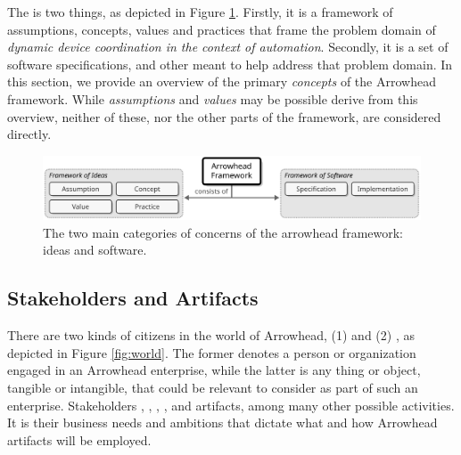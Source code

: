 %
%

The  is two things, as depicted in Figure \ref{fig:framework}.
Firstly, it is a framework of assumptions, concepts, values and practices that frame the problem domain of \textit{dynamic device coordination in the context of automation}.
Secondly, it is a set of software specifications,  and other  meant to help address that problem domain.
In this section, we provide an overview of the primary \textit{concepts} of the Arrowhead framework.
While \textit{assumptions} and \textit{values} may be possible derive from this overview, neither of these, nor the other parts of the framework, are considered directly.

\vspace*{1mm}

\begin{figure}[ht!]
  \centering
  \includegraphics[scale=0.9]{figures/framework}
  \caption{
    The two main categories of concerns of the arrowhead framework: ideas and software.
  }
  \label{fig:framework}
\end{figure}

\vspace*{-3mm}

\subsection{Stakeholders and Artifacts}

There are two kinds of citizens in the world of Arrowhead, (1)  and (2) , as depicted in Figure \ref{fig:world}.
The former denotes a person or organization engaged in an Arrowhead enterprise, while the latter is any thing or object, tangible or intangible, that could be relevant to consider as part of such an enterprise.
Stakeholders , , , , and  artifacts, among many other possible activities.
It is their business needs and ambitions that dictate what and how Arrowhead artifacts will be employed.

